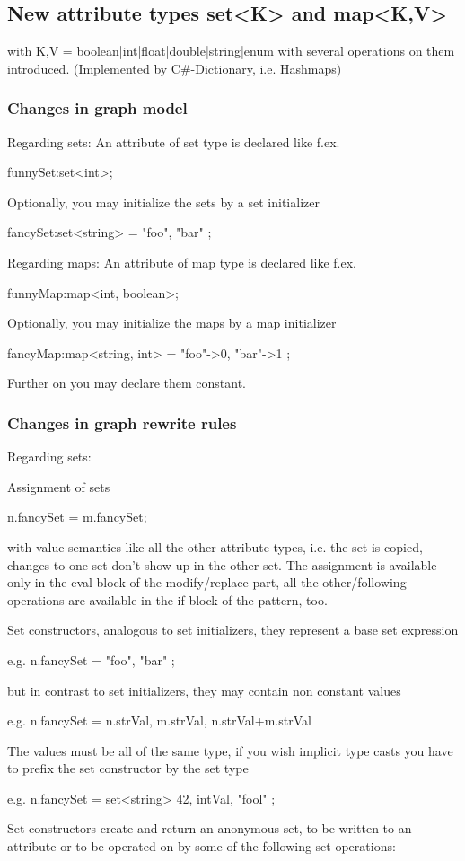 \subsection{New attribute types set<K> and map<K,V>}
with K,V = boolean|int|float|double|string|enum
with several operations on them introduced.
(Implemented by C\#-Dictionary, i.e. Hashmaps)

\subsubsection{Changes in graph model}

Regarding sets:
An attribute of set type is declared like f.ex.
\begin{grgenlet} funnySet:set<int>; \end{grgenlet}
Optionally, you may initialize the sets by a set initializer
\begin{grgenlet} fancySet:set<string> = { "foo", "bar" }; \end{grgenlet}

Regarding maps:
An attribute of map type is declared like f.ex.
\begin{grgenlet} funnyMap:map<int, boolean>; \end{grgenlet}
Optionally, you may initialize the maps by a map initializer
\begin{grgenlet} fancyMap:map<string, int> = { "foo"->0, "bar"->1 }; \end{grgenlet}

Further on you may declare them constant.

\subsubsection{Changes in graph rewrite rules}

Regarding sets:

Assignment of sets
\begin{grgenlet} n.fancySet = m.fancySet; \end{grgenlet}
with value semantics like all the other attribute types, 
i.e. the set is copied, changes to one set don't show up in the other set.
The assignment is available only in the eval-block of the modify/replace-part, 
all the other/following operations are available in the if-block of the pattern, too.

Set constructors, analogous to set initializers, they represent a base set expression
\begin{grgenlet} e.g. n.fancySet = { "foo", "bar" }; \end{grgenlet}
but in contrast to set initializers, they may contain non constant values
\begin{grgenlet} e.g. n.fancySet = { n.strVal, m.strVal, n.strVal+m.strVal } \end{grgenlet}
The values must be all of the same type, if you wish implicit type casts
you have to prefix the set constructor by the set type
\begin{grgenlet} e.g. n.fancySet = set<string>{ 42, intVal, "fool" }; \end{grgenlet}
Set constructors create and return an anonymous set,
to be written to an attribute or to be operated on by some of the following set operations:

